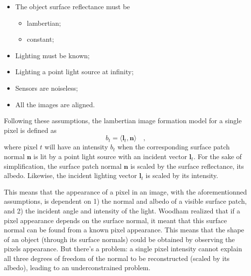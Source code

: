 \documentclass{report}
\begin{document}
\begin{itemize} \setlength\itemsep{-0.2em}
  \item The object surface reflectance must be
  \vspace{-0.65em}\begin{itemize} \setlength\itemsep{0.1em}
    \item lambertian;
    \item constant;
  \end{itemize} \vspace{-0.4em}
  \item Lighting must be known;
  \item Lighting a point light source at infinity;
  \item Sensors are noiseless;
  \item All the images are aligned.
\end{itemize}

Following these assumptions, the lambertian image formation model for a single pixel is defined as
\begin{equation}
b_t =  \langle \mathbf{l}_t , \mathbf{n} \rangle \quad,
\end{equation}
where pixel $t$ will have an intensity $b_t$ when the corresponding surface patch normal $\mathbf{n}$ is lit by a point light source with an incident vector $\mathbf{l}_t$. For the sake of simplification, the surface patch normal $\mathbf{n}$ is scaled by the surface reflectance, its albedo. Likewise, the incident lighting vector $\mathbf{l}_t$ is scaled by its intensity.

This means that the appearance of a pixel in an image, with the aforementionned assumptions, is dependent on 1) the normal and albedo of a visible surface patch, and 2) the incident angle and intensity of the light. Woodham realized that if a pixel appearance depends on the surface normal, it meant that this surface normal can be found from a known pixel appearance. This means that the shape of an object (through its surface normals) could be obtained by observing the pixels appearance. But there's a problem: a single pixel intensity cannot explain all three degrees of freedom of the normal to be reconstructed (scaled by its albedo), leading to an underconstrained problem.
\end{document}
